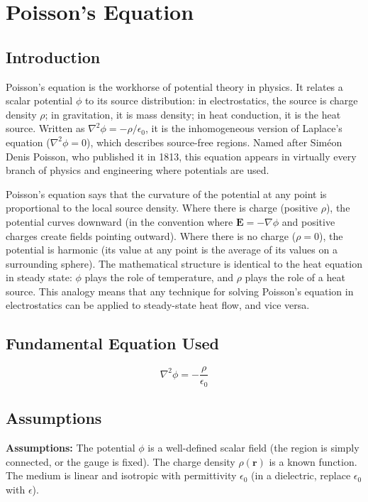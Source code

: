 \chapter{Poisson's Equation}

\section*{Introduction}

Poisson's equation is the workhorse of potential theory in physics. It relates a scalar potential $\phi$ to its source distribution: in electrostatics, the source is charge density $\rho$; in gravitation, it is mass density; in heat conduction, it is the heat source. Written as $\nabla^2\phi = -\rho/\epsilon_0$, it is the inhomogeneous version of Laplace's equation ($\nabla^2\phi = 0$), which describes source-free regions. Named after Siméon Denis Poisson, who published it in 1813, this equation appears in virtually every branch of physics and engineering where potentials are used.

Poisson's equation says that the curvature of the potential at any point is proportional to the local source density. Where there is charge (positive $\rho$), the potential curves downward (in the convention where $\mathbf{E} = -\nabla\phi$ and positive charges create fields pointing outward). Where there is no charge ($\rho = 0$), the potential is harmonic (its value at any point is the average of its values on a surrounding sphere). The mathematical structure is identical to the heat equation in steady state: $\phi$ plays the role of temperature, and $\rho$ plays the role of a heat source. This analogy means that any technique for solving Poisson's equation in electrostatics can be applied to steady-state heat flow, and vice versa.
\section*{Fundamental Equation Used}

\begin{equation}
\nabla^2\phi = -\frac{\rho}{\epsilon_0}
\end{equation}
\section*{Assumptions}

\textbf{Assumptions:} The potential $\phi$ is a well-defined scalar field (the region is simply connected, or the gauge is fixed). The charge density $\rho(\mathbf{r})$ is a known function. The medium is linear and isotropic with permittivity $\epsilon_0$ (in a dielectric, replace $\epsilon_0$ with $\epsilon$).


